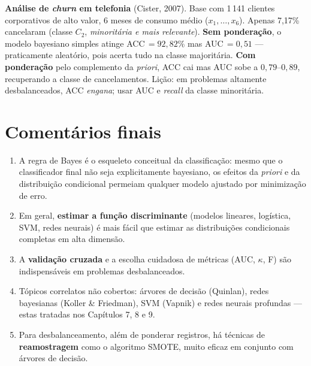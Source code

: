 \begin{aplicacao}
\textbf{Análise de \emph{churn} em telefonia} (Cister, 2007). Base com
1\,141 clientes corporativos de alto valor, 6 meses de consumo médio
($x_1,\dots,x_6$). Apenas 7{,}17\% cancelaram (classe $C_2$,
\emph{minoritária e mais relevante}). \textbf{Sem ponderação}, o
modelo bayesiano simples atinge ACC$\,=92{,}82\%$ mas AUC$\,=0{,}51$
--- praticamente aleatório, pois acerta tudo na classe majoritária.
\textbf{Com ponderação} pelo complemento da \emph{priori}, ACC cai
mas AUC sobe a $0{,}79$--$0{,}89$, recuperando a classe de
cancelamentos. Lição: em problemas altamente desbalanceados, ACC
\emph{engana}; usar AUC e \emph{recall} da classe minoritária.
\end{aplicacao}

\section{Comentários finais}

\begin{enumerate}[leftmargin=1.2cm]
  \item A regra de Bayes é o esqueleto conceitual da classificação:
        mesmo que o classificador final não seja explicitamente
        bayesiano, os efeitos da \emph{priori} e da distribuição
        condicional permeiam qualquer modelo ajustado por
        minimização de erro.
  \item Em geral, \textbf{estimar a função discriminante} (modelos
        lineares, logística, SVM, redes neurais) é mais fácil que
        estimar as distribuições condicionais completas em alta
        dimensão.
  \item A \textbf{validação cruzada} e a escolha cuidadosa de
        métricas (AUC, $\kappa$, F) são indispensáveis em problemas
        desbalanceados.
  \item Tópicos correlatos não cobertos: árvores de decisão
        (Quinlan), redes bayesianas (Koller \& Friedman), SVM
        (Vapnik) e redes neurais profundas --- estas tratadas nos
        Capítulos 7, 8 e 9.
  \item Para desbalanceamento, além de ponderar registros, há
        técnicas de \textbf{reamostragem} como o algoritmo SMOTE,
        muito eficaz em conjunto com árvores de decisão.
\end{enumerate}


